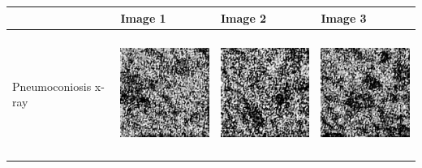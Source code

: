 \begin{table}[H]
\centering
\begin{tabularx}{\linewidth}{@{}>{\centering\arraybackslash}m{3cm}>{\centering\arraybackslash}X>{\centering\arraybackslash}X>{\centering\arraybackslash}X@{}}
\toprule
 & Image 1 & Image 2 & Image 3 \\
\midrule
Pneumoconiosis x-ray & \includegraphics[valign=M,width=\linewidth,height=4cm,keepaspectratio]{main/content/images/sd_hyperdreambooth/pneumoconiosis/xray1.jpeg} & \includegraphics[valign=M,width=\linewidth,height=4cm,keepaspectratio]{main/content/images/sd_hyperdreambooth/pneumoconiosis/xray2.jpeg} & \includegraphics[valign=M,width=\linewidth,height=4cm,keepaspectratio]{main/content/images/sd_hyperdreambooth/pneumoconiosis/xray3.jpeg} \\
\midrule

\end{tabularx}
\end{table}
